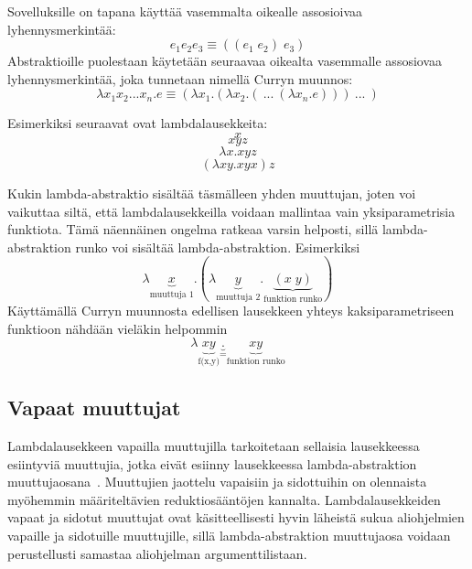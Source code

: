 Sovelluksille on tapana käyttää vasemmalta oikealle assosioivaa lyhennysmerkintää: 
\[e_{1} e_{2} e_{3} \equiv ((e_{1} \; e_{2}) \; e_{3})\]
Abstraktioille puolestaan käytetään seuraavaa oikealta vasemmalle assosiovaa lyhennysmerkintää, joka tunnetaan nimellä Curryn muunnos: 
\[ \lambda x_{1}x_{2}...x_{n}.e \equiv (\lambda x_{1} . ( \lambda x_{2} . ( \: ... \: ( \lambda x_{n} . e ))) \: ... \: ) \]

\par
Esimerkiksi seuraavat ovat lambdalausekkeita:
\[ x \]
\[ xyz \]
\[ \lambda x . xyz \]
\[ (\lambda xy . xyx) z \]

\par

Kukin lambda-abstraktio sisältää täsmälleen yhden muuttujan, joten voi vaikuttaa siltä, että lambdalausekkeilla voidaan mallintaa vain yksiparametrisia funktiota. Tämä näennäinen ongelma ratkeaa varsin helposti, sillä lambda-abstraktion runko voi sisältää lambda-abstraktion. Esimerkiksi
\[ \lambda \underbrace{x}_{\text{muuttuja 1}} . ( \lambda \underbrace{y}_{\text{muuttuja 2}} . \underbrace{(x \; y)}_{\text{funktion runko}} ) \]
Käyttämällä Curryn muunnosta edellisen lausekkeen yhteys kaksiparametriseen funktioon nähdään vieläkin helpommin
\[ \lambda \underbrace{xy}_{\text{f(x,y)}} \underbrace{.}_{=} \underbrace{xy}_{\text{funktion runko}}  \]

\subsection{Vapaat muuttujat}

Lambdalausekkeen vapailla muuttujilla tarkoitetaan sellaisia lausekkeessa esiintyviä muuttujia, jotka eivät esiinny lausekkeessa lambda-abstraktion muuttujaosana~\cite[s.~8]{Hudak89}. Muuttujien jaottelu vapaisiin ja sidottuihin on olennaista myöhemmin määriteltävien reduktiosääntöjen kannalta. Lambdalausekkeiden vapaat ja sidotut muuttujat ovat käsitteellisesti hyvin läheistä sukua aliohjelmien vapaille ja sidotuille muuttujille, sillä lambda-abstraktion muuttujaosa voidaan perustellusti samastaa aliohjelman argumenttilistaan.

